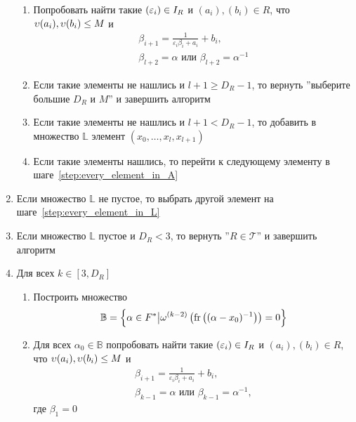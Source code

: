 \documentclass[_00_dissertation.tex]{subfiles}
\begin{document}
\begin{algorithm}
\begin{enumerate}
\begin{enumerate}
            \item Попробовать найти такие $(\varepsilon_i) \in I_{R}$ и $(a_i), (b_i) \in R$, что $\upsilon(a_i),\upsilon(b_i) \le M$ и
            \begin{equation*}
                \begin{split}
                    \beta_{i+1}=\frac{1}{\varepsilon_i \beta_i + a_i} + b_i,\\
                    \beta_{l+2}=\alpha \textrm{ или } \beta_{l+2}=\alpha^{-1}
                \end{split}
            \end{equation*}

            \item Если такие элементы не нашлись и $l+1 \ge D_R - 1$, то вернуть ''выберите большие $D_R$ и $M$'' и завершить алгоритм
            
            \item Если такие элементы не нашлись и $l+1 < D_R - 1$, то добавить в множество $\mathbb{L}$ элемент $(x_0,\ldots,x_l,x_{l+1})$
            
            \item Если такие элементы нашлись, то перейти к следующему элементу в шаге~\ref{step:every_element_in_A}
        \end{enumerate}

        \item Если множество $\mathbb{L}$ не пустое, то выбрать другой элемент на шаге~\ref{step:every_element_in_L}
        
        \item Если множество $\mathbb{L}$ пустое и $D_R < 3$, то вернуть ''$R \in \mathcal{T}$'' и завершить алгоритм
        
        \item Для всех $k \in [3, D_R]$
        \begin{enumerate}
            \item Построить множество
            \begin{equation*}
                \mathbb{B} = \left\{
                    \alpha \in F^{*} \big| \omega^{(k-2)}\left(
                        \textrm{fr}\left((\alpha-x_0)^{-1}\right)
                    \right) = 0
                \right\}
            \end{equation*}

            \item Для всех $\alpha_0 \in \mathbb{B}$ попробовать найти такие $(\varepsilon_i) \in I_{R}$ и $(a_i), (b_i) \in R$, что $\upsilon(a_i), \upsilon(b_i) \le M$ и
            \begin{equation*}
                \begin{split}
                    \beta_{i+1}=\frac{1}{\varepsilon_i \beta_i + a_i} + b_i,\\
                    \beta_{k-1}=\alpha \textrm{ или } \beta_{k-1}=\alpha^{-1},
                \end{split}
            \end{equation*}
            где $\beta_1 = 0$


\end{enumerate}
\end{enumerate}
\end{algorithm}
\end{document}
